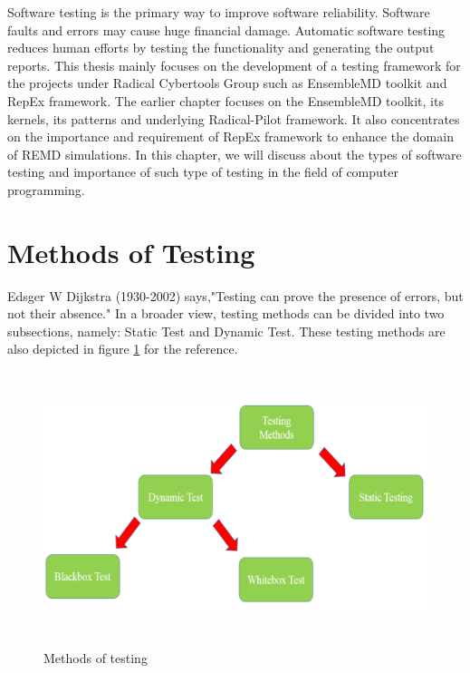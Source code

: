 \documentclass[10pt]{ruthesis}
\begin{document}
Software testing is the primary way to improve software reliability. Software faults and errors may cause huge financial damage. Automatic software testing reduces human efforts by testing the functionality and generating the output reports. This thesis mainly focuses on the development of a testing framework for the projects under Radical Cybertools Group such as EnsembleMD toolkit and RepEx framework. The earlier chapter focuses on the EnsembleMD toolkit, its kernels, its patterns and underlying Radical-Pilot framework. It also concentrates on the importance and requirement of RepEx framework to enhance the domain of REMD simulations. In this chapter, we will discuss about the types of software testing and importance of such type of testing in the field of computer programming.

\section{Methods of Testing}

Edsger W Dijkstra (1930-2002) says,"Testing can prove the presence of errors, but not their absence." In a broader view, testing methods can be divided into two subsections, namely: Static Test and Dynamic Test. These testing methods are also depicted in figure \ref{fig:test_met} for the reference.

\begin{figure}
  \centering
  \includegraphics[width=17cm,height=8cm]{test_method.png}
  \caption{Methods of testing}
  \label{fig:test_met}
\end{figure}
\end{document}
